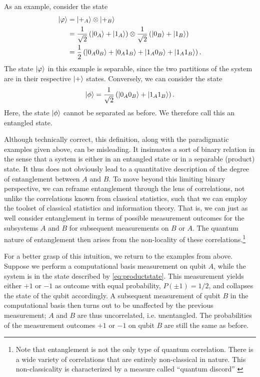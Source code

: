 As an example, consider the state
\begin{align}
  \ket{\varphi} &= \ket{+_A} \otimes \ket{+_B}\nonumber\\&= \frac{1}{\sqrt{2}}\left( \ket{0_A} +
  \ket{1_A} \right) \otimes \frac{1}{\sqrt{2} } \left(  \ket{0_B} +
    \ket{1_B} \right) \label{eq:productstate}\\&= \frac{1}{2}\left( \ket{0_A 0_B} + \ket{0_A 1_B} + \ket{1_A
0_B} + \ket{1_A 1_B}\right) \nonumber
.\end{align}
The state $\ket{\varphi}$ in this example is separable, since the two partitions
of the system are in their respective $\ket{+}$ states. Conversely, we can
consider the state
\begin{align}\label{eq:entangledstate}
  \ket{\phi} = \frac{1}{\sqrt{2} }\left( \ket{0_A 0_B} + \ket{1_A 1_B} \right) 
.\end{align}
Here, the state $\ket{\phi}$ cannot be separated as before. We therefore call
this an entangled state.

Although technically correct, this definition, along with the paradigmatic
examples given above, can be misleading. It insinuates a sort of binary
relation in the sense that a system is either in an entangled state or in a
separable (product) state. It thus does not obviously lead to a quantitative
description of the degree of entanglement between $A$ and $B$.  To move beyond
this limiting binary perspective, we can reframe entanglement through the lens
of correlations,
not unlike the correlations known from classical statistics, such that we can
employ the toolset of classical statistics and information theory. That is, we
can just as well consider entanglement in terms of possible measurement
outcomes for the subsystems $A$ and $B$ for subsequent measurements on $B$ or
$A$. The quantum nature of entanglement then arises from the non-locality of
these correlations.\footnote{Note that entanglement is not the only type of
  quantum correlation. There is a wide variety of correlations that are
entirely non-classical in nature. This non-classicality is characterized by a
measure called \enquote{quantum discord}
\cite{dakicNecessarySufficientCondition2010}}

For a better grasp of this intuition, we return to the examples from above.
Suppose we perform a computational basis measurement on qubit $A$, while the
system is in the state described by \cref{eq:productstate}. This measurement
yields either $+1$ or $-1$ as outcome with equal probability, $P(\pm 1) = 1
/2$, and collapses the state of the qubit accordingly. A subsequent measurement
of qubit $B$ in the computational basis then turns out to be unaffected by the
previous measurement; $A$ and $B$ are thus uncorrelated, i.e. unentangled. The
probabilities of the measurement outcomes $+1$ or $-1$ on qubit $B$ are still the
same as before.

